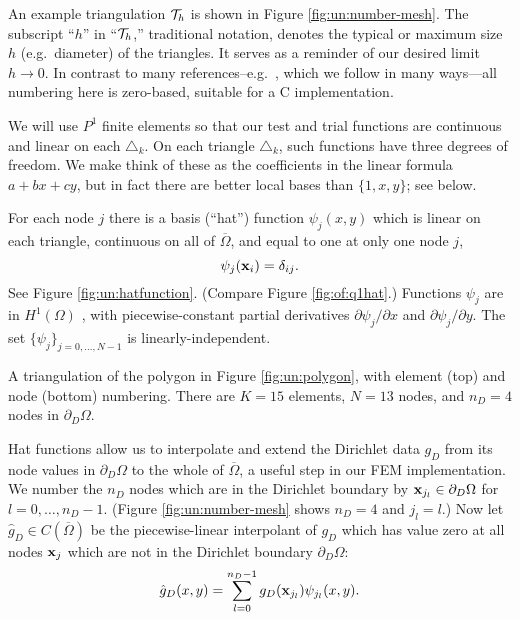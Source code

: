 An example triangulation $\mathcal{T}_h$ is shown in Figure \ref{fig:un:number-mesh}.  The subscript ``$h$'' in ``$\mathcal{T}_h$,'' traditional notation, denotes the typical or maximum size $h$ (e.g.~diameter) of the triangles.  It serves as a reminder of our desired limit $h\to 0$.  In contrast to many references--e.g.~\citet{Elmanetal2005}, which we follow in many ways---all numbering here is zero-based, suitable for a C implementation.

We will use $P^1$ finite elements \citep{Elmanetal2005} so that our test and trial functions are continuous and linear on each $\triangle_k$.  On each triangle $\triangle_k$, such functions have three degrees of freedom.  We make think of these as the coefficients in the linear formula $a + b x + c y$, but in fact there are better local bases than $\{1,x,y\}$; see below.

For each node $j$ there is a basis (``hat'') function  $\psi_j(x,y)$ which is linear on each triangle, continuous on all of $\overline{\Omega}$, and equal to one at only one node $j$,
\begin{equation*}
\psi_j(\mathbf{x}_i) = \delta_{ij}.
\end{equation*}
See Figure \ref{fig:un:hatfunction}.  (Compare Figure \ref{fig:of:q1hat}.)  Functions $\psi_j$ are in $H^1(\Omega)$ \citep{Braess2007}, with piecewise-constant partial derivatives $\partial\psi_j/\partial x$ and $\partial\psi_j/\partial y$.  The set $\{\psi_j\}_{j=0,\dots,N-1}$ is linearly-independent.

\begin{marginfigure}


\medskip


\caption{A triangulation of the polygon in Figure \ref{fig:un:polygon}, with element (top) and node (bottom) numbering.  There are $K=15$ elements, $N=13$ nodes, and $n_D=4$ nodes in $\partial_D\Omega$.}
\label{fig:un:number-mesh}
\end{marginfigure}

Hat functions allow us to interpolate and extend the Dirichlet data $g_D$ from its node values in $\partial_D \Omega$ to the whole of $\overline\Omega$, a useful step in our FEM implementation.  We number the $n_D$ nodes which are in the Dirichlet boundary by $\mathbf{x}_{j_l} \in \partial_D\Omega$ for $l=0,\dots,n_D-1$.  (Figure \ref{fig:un:number-mesh} shows $n_D=4$ and $j_l=l$.)  Now let $\hat g_D \in C(\overline\Omega)$ be the piecewise-linear interpolant of $g_D$ which has value zero at all nodes $\mathbf{x}_j$ which are not in the Dirichlet boundary $\partial_D \Omega$:
\begin{equation}
\hat g_D(x,y) = \sum_{l=0}^{n_D-1} g_D(\mathbf{x}_{j_l}) \psi_{j_l}(x,y). \label{eq:un:hatgdefine}
\end{equation}

